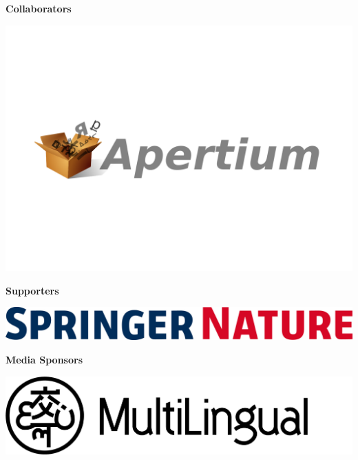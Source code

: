 \documentclass[11pt,oneside]{book}
\begin{document}
  \bigskip
  \bigskip
    \begin{samepage}
  \noindent
  {\Large \textbf{Collaborators}}

  \nopagebreak
            \begin{minipage}[c][0.21\linewidth][c]{0.30\linewidth}
        \includegraphics[width=\linewidth]{eamt_volume_1/sponsor_logos/apertium_open_box_line.svg.pdf}
      \end{minipage}\hspace{0.05\linewidth}
    
    \end{samepage}

  \bigskip
  \bigskip
    \begin{samepage}
  \noindent
  {\Large \textbf{Supporters}}

  \nopagebreak
            \begin{minipage}[c][0.21\linewidth][c]{0.30\linewidth}
        \includegraphics[width=\linewidth]{eamt_volume_1/sponsor_logos/SN_logo_RGB-2.jpg}
      \end{minipage}\hspace{0.05\linewidth}
    
    \end{samepage}

  \bigskip
  \bigskip
    \begin{samepage}
  \noindent
  {\Large \textbf{Media Sponsors}}

  \nopagebreak
            \begin{minipage}[c][0.21\linewidth][c]{0.30\linewidth}
        \includegraphics[width=\linewidth]{eamt_volume_1/sponsor_logos/Logotype_With_Mark.png}
      \end{minipage}\hspace{0.05\linewidth}
    
    \end{samepage}
\end{document}
